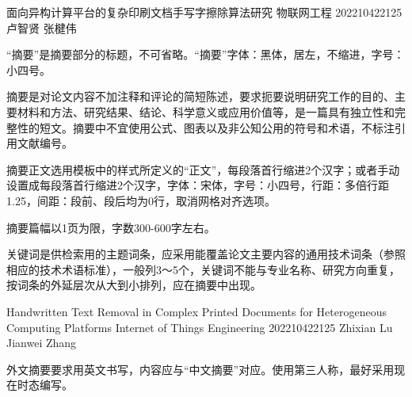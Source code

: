 \documentclass[UTF8,twoside]{ctexrep}
\begin{document}





\newcommand{\abstractPersonalInfoIndent}{10em}     %
\makeChineseAbstractHeader                         %
  {面向异构计算平台的复杂印刷文档手写字擦除算法研究}
  {物联网工程}
  {202210422125}
  {卢智贤}
  {张楗伟}

\ChineseAbstractTextStart
“摘要”是摘要部分的标题，不可省略。“摘要”字体：黑体，居左，不缩进，字号：小四号。

摘要是对论文内容不加注释和评论的简短陈述，要求扼要说明研究工作的目的、主要材料和方法、研究结果、结论、科学意义或应用价值等，是一篇具有独立性和完整性的短文。摘要中不宜使用公式、图表以及非公知公用的符号和术语，不标注引用文献编号。

摘要正文选用模板中的样式所定义的“正文”，每段落首行缩进2个汉字；或者手动设置成每段落首行缩进2个汉字，字体：宋体，字号：小四号，行距：多倍行距1.25，间距：段前、段后均为0行，取消网格对齐选项。

摘要篇幅以1页为限，字数300-600字左右。

关键词是供检索用的主题词条，应采用能覆盖论文主要内容的通用技术词条（参照相应的技术术语标准），一般列3～5个，关键词不能与专业名称、研究方向重复，按词条的外延层次从大到小排列，应在摘要中出现。



\ChineseAbstractTextFinish


\newcommand{\englishAbstractPersonalInfoIndent}{5em} %
\makeEnglishAbstractHeader                           %
  {Handwritten Text Removal in Complex Printed Documents for Heterogeneous Computing Platforms}
  {Internet of Things Engineering}
  {202210422125}
  {Zhixian Lu}
  {Jianwei Zhang}

\EnglishAbstractTextStart
外文摘要要求用英文书写，内容应与“中文摘要”对应。使用第三人称，最好采用现在时态编写。
\end{document}
